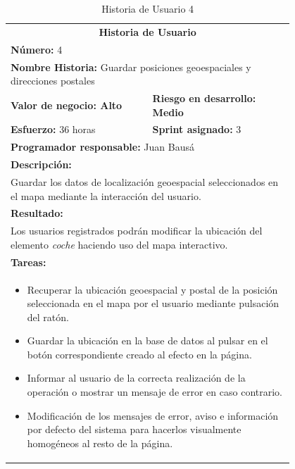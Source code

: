 	\begin{table}[H]
	  \centering 
	 	\begin{tabular}{p{0.4\linewidth}p{0.4\linewidth}}
	    \toprule
	    \multicolumn{2}{c}{\cellcolor{black!30}\textbf{Historia de Usuario}} 													\\
		\multicolumn{2}{l}{\cellcolor{gray!25}\textbf{Número: }4}																\\
		\multicolumn{2}{l}{\textbf{Nombre Historia: } Guardar posiciones geoespaciales y direcciones postales}				\\
		\cellcolor{gray!25}\textbf{Valor de negocio: Alto}	&	\cellcolor{gray!25}\textbf{Riesgo en desarrollo: Medio}		\\
		\textbf{Esfuerzo:} 36 horas				&	\textbf{Sprint asignado: }3 												\\
		\multicolumn{2}{l}{\cellcolor{gray!25}\textbf{Programador responsable: }Juan Bausá}									\\
		\multicolumn{2}{l}{\textbf{Descripción:}}                                                     						\\
		\multicolumn{2}{l}{\parbox{15cm}{Guardar los datos de localización geoespacial seleccionados en el mapa mediante la interacción del usuario.}}				\\
		\multicolumn{2}{l}{\cellcolor{gray!25}\textbf{Resultado:}}																\\		
		\multicolumn{2}{l}{\parbox{15cm}{Los usuarios registrados podrán modificar la ubicación del elemento \textit{coche} haciendo uso del mapa interactivo.}}																									\\
		\multicolumn{2}{l}{\textbf{Tareas:}}																					\\
		\multicolumn{2}{l}{
			\begin{minipage}{12cm}
	    		\vskip 4pt
	    		\begin{itemize}
	    			\item Recuperar la ubicación geoespacial y postal de la posición seleccionada en el mapa por el usuario mediante pulsación del ratón.
	    			\item Guardar la ubicación en la base de datos al pulsar en el botón correspondiente creado al efecto en la página.
	    			\item Informar al usuario de la correcta realización de la operación o mostrar un mensaje de error en caso contrario.
	    			\item Modificación de los mensajes de error, aviso e información por defecto del sistema para hacerlos visualmente homogéneos al resto de la página.
				\end{itemize}
			  	\vskip 4pt
		 	\end{minipage}
		} \\																				
	    \hline
	  \end{tabular}
	  \caption{Historia de Usuario 4}
	\end{table}
	
